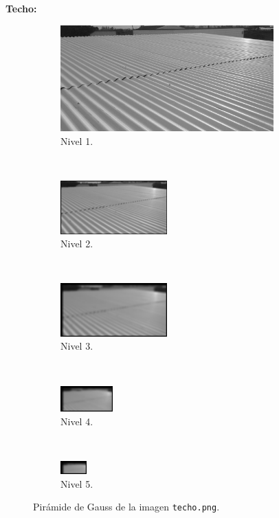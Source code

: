 \documentclass[12pt, letterpaper]{article}
\begin{document}
\par \textbf{Techo:}

\begin{figure}[H]
  \centering
  \begin{subfigure}[t]{0.48\textwidth}
    \centering
    \includegraphics[width = 0.9\textwidth]{techo/gp1.png}
    \caption{Nivel 1.}
  \end{subfigure}
  ~ 
  \begin{subfigure}[t]{0.48\textwidth}
      \centering
      \includegraphics[width = 0.45\textwidth]{techo/gp2.png}
      \caption{Nivel 2.}
  \end{subfigure}
  ~ 
  \begin{subfigure}[t]{0.32\textwidth}
      \centering
      \includegraphics[width = 0.45\textwidth]{techo/gp3.png}
      \caption{Nivel 3.}
  \end{subfigure}
  ~ 
  \begin{subfigure}[t]{0.32\textwidth}
      \centering
      \includegraphics[width = 0.22\textwidth]{techo/gp4.png}
      \caption{Nivel 4.}
  \end{subfigure}
  ~ 
  \begin{subfigure}[t]{0.32\textwidth}
      \centering
      \includegraphics[width = 0.11\textwidth]{techo/gp5.png}
      \caption{Nivel 5.}
  \end{subfigure}
  \caption{Pirámide de Gauss de la imagen \texttt{techo.png}.}
  \label{gptecho}
\end{figure}
\end{document}
